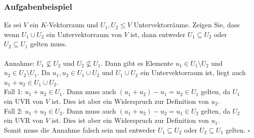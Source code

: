 \begin{frame}\frametitle{Aufgabenbeispiel}
Es sei $V$ ein $K$-Vektorraum und $U_1,U_2 \le V$ Untervektorräume. Zeigen Sie, dass wenn $U_1 \cup U_2$ ein Untervektorraum von $V$ ist, dann entweder $U_1 \subseteq U_2$ oder $U_2 \subseteq U_1$ gelten muss.\\\pause \vfill
{}\\
Annahme: $U_1 \nsubseteq U_2$ und $U_2 \nsubseteq U_1$. Dann gibt es Elemente $u_1 \in U_1 \setminus U_2$ und $u_2 \in U_2 \setminus U_1$. Da $u_1,u_2 \in U_1\cup U_2$ und $U_1\cup U_2$ ein Untervektorraum ist, liegt auch $u_1+u_2 \in U_1\cup U_2$. \\\pause
Fall 1: $u_1+u_2 \in U_1$. Dann muss auch $(u_1+u_2)-u_1=u_2 \in U_1$ gelten, da $U_1$ ein UVR von $V$ ist. Dies ist aber ein Widerspruch zur Definition von $u_2$.\\\pause
Fall 2: $u_1+u_2 \in U_2$. Dann muss auch $(u_1+u_2)-u_2=u_1 \in U_2$ gelten, da $U_2$ ein UVR von $V$ ist. Dies ist aber ein Widerspruch zur Definition von $u_1$.\\\pause
Somit muss die Annahme falsch sein und entweder $U_1 \subseteq U_2$ oder $U_2 \subseteq U_1$ gelten. \hfill $\square$
\end{frame}
%
